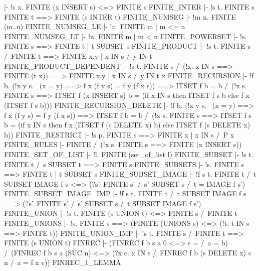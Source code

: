   |- !s x. FINITE (x INSERT s) <=> FINITE s
\ENDTHEOREM
\THEOREM FINITE\_INTER
  |- !s t. FINITE s \/ FINITE t ==> FINITE (s INTER t)
\ENDTHEOREM
\THEOREM FINITE\_NUMSEG
  |- !m n. FINITE (m..n)
\ENDTHEOREM
\THEOREM FINITE\_NUMSEG\_LE
  |- !n. FINITE {m | m <= n}
\ENDTHEOREM
\THEOREM FINITE\_NUMSEG\_LT
  |- !n. FINITE {m | m < n}
\ENDTHEOREM
\THEOREM FINITE\_POWERSET
  |- !s. FINITE s ==> FINITE {t | t SUBSET s}
\ENDTHEOREM
\THEOREM FINITE\_PRODUCT
  |- !s t. FINITE s /\ FINITE t ==> FINITE {x,y | x IN s /\ y IN t}
\ENDTHEOREM
\THEOREM FINITE\_PRODUCT\_DEPENDENT
  |- !s t.
         FINITE s /\ (!x. x IN s ==> FINITE (t x))
         ==> FINITE {x,y | x IN s /\ y IN t x}
\ENDTHEOREM
\THEOREM FINITE\_RECURSION
  |- !f b.
         (!x y s. ~(x = y) ==> f x (f y s) = f y (f x s))
         ==> ITSET f {} b = b /\
             (!x s.
                  FINITE s
                  ==> ITSET f (x INSERT s) b =
                      (if x IN s then ITSET f s b else f x (ITSET f s b)))
\ENDTHEOREM
\THEOREM FINITE\_RECURSION\_DELETE
  |- !f b.
         (!x y s. ~(x = y) ==> f x (f y s) = f y (f x s))
         ==> ITSET f {} b = b /\
             (!x s.
                  FINITE s
                  ==> ITSET f s b =
                      (if x IN s
                       then f x (ITSET f (s DELETE x) b)
                       else ITSET f (s DELETE x) b))
\ENDTHEOREM
\THEOREM FINITE\_RESTRICT
  |- !s p. FINITE s ==> FINITE {x | x IN s /\ P x}
\ENDTHEOREM
\THEOREM FINITE\_RULES
  |- FINITE {} /\ (!x s. FINITE s ==> FINITE (x INSERT s))
\ENDTHEOREM
\THEOREM FINITE\_SET\_OF\_LIST
  |- !l. FINITE (set_of_list l)
\ENDTHEOREM
\THEOREM FINITE\_SUBSET
  |- !s t. FINITE t /\ s SUBSET t ==> FINITE s
\ENDTHEOREM
\THEOREM FINITE\_SUBSETS
  |- !s. FINITE s ==> FINITE {t | t SUBSET s}
\ENDTHEOREM
\THEOREM FINITE\_SUBSET\_IMAGE
  |- !f s t.
         FINITE t /\ t SUBSET IMAGE f s <=>
         (?s'. FINITE s' /\ s' SUBSET s /\ t = IMAGE f s')
\ENDTHEOREM
\THEOREM FINITE\_SUBSET\_IMAGE\_IMP
  |- !f s t.
         FINITE t /\ t SUBSET IMAGE f s
         ==> (?s'. FINITE s' /\ s' SUBSET s /\ t SUBSET IMAGE f s')
\ENDTHEOREM
\THEOREM FINITE\_UNION
  |- !s t. FINITE (s UNION t) <=> FINITE s /\ FINITE t
\ENDTHEOREM
\THEOREM FINITE\_UNIONS
  |- !s. FINITE s ==> (FINITE (UNIONS s) <=> (!t. t IN s ==> FINITE t))
\ENDTHEOREM
\THEOREM FINITE\_UNION\_IMP
  |- !s t. FINITE s /\ FINITE t ==> FINITE (s UNION t)
\ENDTHEOREM
\THEOREM FINREC
  |- (FINREC f b s a 0 <=> s = {} /\ a = b) /\
     (FINREC f b s a (SUC n) <=>
      (?x c. x IN s /\ FINREC f b (s DELETE x) c n /\ a = f x c))
\ENDTHEOREM
\THEOREM FINREC\_1\_LEMMA
